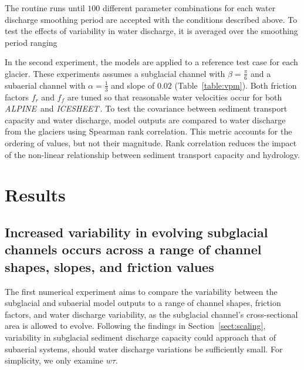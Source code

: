 \documentclass[esurf, manuscript]{copernicus}
\newcommand{\alpine}{\textit{ALPINE}\,}
\newcommand{\icesheet}{\textit{ICESHEET}\,}
\begin{document}
The routine runs until $100$ different parameter combinations for each water discharge smoothing period are accepted with the conditions described above.
To test the effects of variability in water discharge, it is averaged over the smoothing period ranging 

In the second experiment, the models are applied to a reference test case for each glacier.
These experiments assumes  a subglacial channel with $\beta=\frac{\pi}{6}$ and a subaerial channel with $\alpha = \frac{1}{3}$ and slope of $0.02$ (Table~\ref{table:vpm}).
Both friction factors $f_r$ and $f_f$ are tuned so that reasonable water velocities \citep[$\sim\,1.6\,$\unit{m}\,\unit{s}$^{-1}$][]{werder2010b,chandler2013} occur for both \alpine{} and \icesheet{}.
% 
To test the covariance between sediment transport capacity and water discharge, model outputs are compared to water discharge from the glaciers using Spearman rank correlation.
This metric accounts for the ordering of values, but not their magnitude.
Rank correlation reduces the impact of the non-linear relationship between sediment transport capacity and hydrology.

\section{Results}

\FloatBarrier
\subsection{Increased variability in evolving subglacial channels occurs across a range of channel shapes, slopes,  and friction values}
\label{sect:ensemble}

The first numerical experiment aims to compare the variability between the subglacial and subaerial model outputs to a range of channel shapes, friction factors, and water discharge variability, as the subglacial channel's cross-sectional area is allowed to evolve.
Following the findings in Section~\ref{sect:scaling}, variability in subglacial sediment discharge capacity could approach that of subaerial systems, should water discharge variations be sufficiently small.
For simplicity, we only examine $w\tau$.
\end{document}
